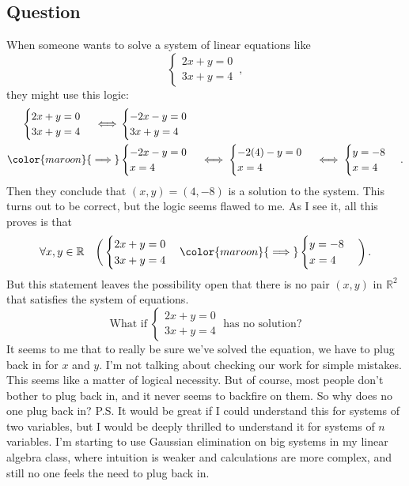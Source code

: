 \documentclass{article}
\begin{document}
\subsection*{Question}
When someone wants to solve a system of linear equations like $$\begin{cases} 2x+y=0 \\ 3x+y=4 \end{cases}\,,$$ they might use this logic: $$\begin{align} \begin{cases} 2x+y=0 \\ 3x+y=4 \end{cases} \iff &\begin{cases} -2x-y=0 \\ 3x+y=4 \end{cases} \\ \color{maroon}{\implies} &\begin{cases} -2x-y=0\\ x=4 \end{cases} \iff \begin{cases} -2(4)-y=0\\ x=4 \end{cases} \iff \begin{cases} y=-8\\ x=4 \end{cases} \,.\end{align}$$ Then they conclude that $(x, y) = (4, -8)$ is a solution to the system. This turns out to be correct, but the logic seems flawed to me. As I see it, all this proves is that $$ \forall{x,y\in\mathbb{R}}\quad \bigg( \begin{cases} 2x+y=0 \\ 3x+y=4 \end{cases} \color{maroon}{\implies} \begin{cases} y=-8\\ x=4 \end{cases} \bigg)\,. $$ But this statement leaves the possibility open that there is no pair $(x, y)$ in $\mathbb{R}^2$ that satisfies the system of equations. $$ \text{What if}\; \begin{cases} 2x+y=0 \\ 3x+y=4 \end{cases} \;\text{has no solution?} $$ It seems to me that to really be sure we've solved the equation, we have to plug back in for $x$ and $y$. I'm not talking about checking our work for simple mistakes. This seems like a matter of logical necessity. But of course, most people don't bother to plug back in, and it never seems to backfire on them. So why does no one plug back in? P.S. It would be great if I could understand this for systems of two variables, but I would be deeply thrilled to understand it for systems of $n$ variables. I'm starting to use Gaussian elimination on big systems in my linear algebra class, where intuition is weaker and calculations are more complex, and still no one feels the need to plug back in.
\end{document}
